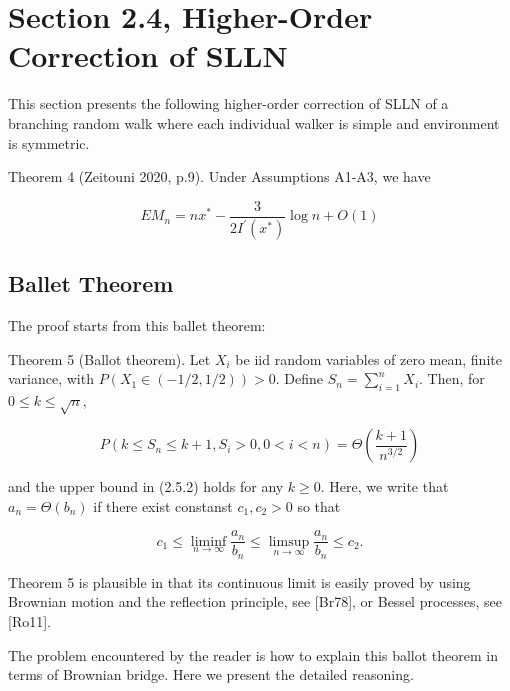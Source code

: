 

\section{Section 2.4, Higher-Order Correction of SLLN}

This section presents the following higher-order correction of SLLN of a branching random walk where each individual walker is simple and environment is symmetric.

\begin{tcolorbox}[colback=gray!10,colframe=black]
Theorem 4 (Zeitouni 2020, p.9). Under Assumptions A1-A3, we have

\[
E M_n=n x^*-\frac{3}{2 I^{\prime}\left(x^*\right)} \log n+O(1)
\]
\end{tcolorbox}

\subsection{Ballet Theorem}

The proof starts from this ballet theorem:

\begin{tcolorbox}[colback=gray!10,colframe=black]
Theorem 5 (Ballot theorem). Let $X_i$ be iid random variables of zero mean, finite variance, with $P\left(X_1 \in(-1 / 2,1 / 2)\right)>0$. Define $S_n=\sum_{i=1}^n X_i$. Then, for $0 \leq k \leq \sqrt{n}$,

\[
P\left(k \leq S_n \leq k+1, S_i>0,0<i<n\right)=\Theta\left(\frac{k+1}{n^{3 / 2}}\right)
\]

and the upper bound in (2.5.2) holds for any $k \geq 0$.
Here, we write that $a_n=\Theta\left(b_n\right)$ if there exist constanst $c_1, c_2>0$ so that

\[
c_1 \leq \liminf _{n \rightarrow \infty} \frac{a_n}{b_n} \leq \limsup _{n \rightarrow \infty} \frac{a_n}{b_n} \leq c_2 .
\]


Theorem 5 is plausible in that its continuous limit is easily proved by using Brownian motion and the reflection principle, see [Br78], or Bessel processes, see [Ro11].
\end{tcolorbox}

The problem encountered by the reader is how to explain this ballot theorem in terms of Brownian bridge. Here we present the detailed reasoning.

